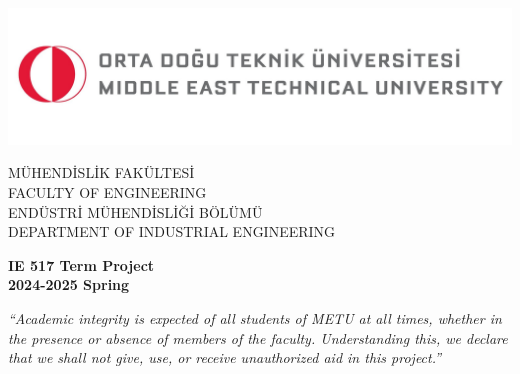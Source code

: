 
\begin{titlepage}
    \begin{center}
        \begin{minipage}{0.9\linewidth}
            \includegraphics[width=\linewidth]{cover-page/images/white_bg_tr_en.jpg}
            \hspace*{6.4em}
            \parbox[h]{0.7\textwidth}{
                \singlespacing
                \footnotesize\color{logogray}\ttfamily
                \vspace*{-1.6cm}
                MÜHENDİSLİK FAKÜLTESİ\\
                FACULTY OF ENGINEERING\\
                ENDÜSTRİ MÜHENDİSLİĞİ BÖLÜMÜ\\
                DEPARTMENT OF INDUSTRIAL ENGINEERING}
        \end{minipage}
        \vspace{4cm}

        \huge{\textbf{IE 517 Term Project}}\\
        \LARGE{\textbf{2024-2025 Spring}}\\
        \vspace{3cm}

        \parbox{0.9\textwidth}{\normalsize\it
        “Academic integrity is expected of all students of METU at all times, whether in the presence or absence of members of the faculty. Understanding this, we declare that we shall not give, use, or receive unauthorized aid in this project.”
        }
        \vspace{1.5cm}


\end{center}
\end{titlepage}
